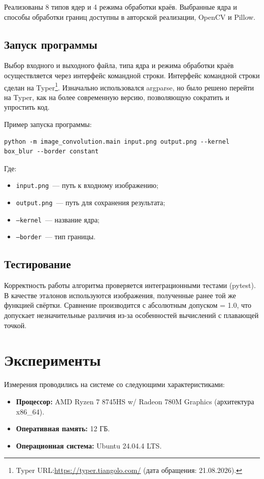 \documentclass[a4paper, 12pt]{article}
\begin{document}
Реализованы 8 типов ядер и 4 режима обработки краёв. Выбранные ядра и способы обработки границ доступны в авторской реализации, OpenCV и Pillow.

\subsection{Запуск программы}

Выбор входного и выходного файла, типа ядра и режима обработки краёв осуществляется через интерфейс командной строки. Интерфейс командной строки сделан на Typer\footnote{ Typer URL:\url{https://typer.tiangolo.com/} (дата обращения: 21.08.2026).}. Изначально использовался argparse, но было решено перейти на Typer, как на более современную версию, позволяющую сократить и упростить код.

Пример запуска программы:
\begin{verbatim}
python -m image_convolution.main input.png output.png --kernel box_blur --border constant
\end{verbatim}

Где:
\begin{itemize}
    \item \texttt{input.png}~--- путь к входному изображению;
    \item \texttt{output.png}~--- путь для сохранения результата;
    \item \texttt{--kernel}~--- название ядра;
    \item \texttt{--border}~--- тип границы.
\end{itemize}

\subsection{Тестирование}

Корректность  работы алгоритма проверяется интеграционными тестами (pytest). В качестве эталонов используются изображения, полученные ранее той же функцией свёртки. Сравнение производится с абсолютным допуском = 1.0, что допускает незначительные различия из-за особенностей вычислений с плавающей точкой.

\section{Эксперименты}

Измерения проводились на системе со следующими характеристиками:

\begin{itemize}

\item \textbf{Процессор:} AMD Ryzen 7 8745HS w/ Radeon 780M Graphics (архитектура x86\_64).

\item \textbf{Оперативная память:} 12 ГБ.

\item \textbf{Операционная система:} Ubuntu 24.04.4 LTS.

\end{itemize}
\end{document}
